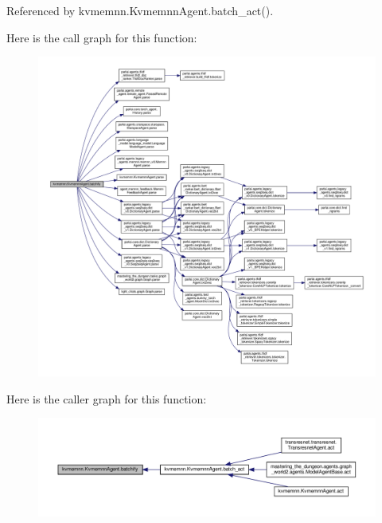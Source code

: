 Referenced by kvmemnn.\+Kvmemnn\+Agent.\+batch\+\_\+act().

Here is the call graph for this function\+:
\nopagebreak
\begin{figure}[H]
\begin{center}
\leavevmode
\includegraphics[width=350pt]{classkvmemnn_1_1KvmemnnAgent_ac7dba84c37dab7ef33f52d263fbdbdc7_cgraph}
\end{center}
\end{figure}
Here is the caller graph for this function\+:
\nopagebreak
\begin{figure}[H]
\begin{center}
\leavevmode
\includegraphics[width=350pt]{classkvmemnn_1_1KvmemnnAgent_ac7dba84c37dab7ef33f52d263fbdbdc7_icgraph}
\end{center}
\end{figure}
\mbox{\label{classkvmemnn_1_1KvmemnnAgent_aa7f07d5123c47f74f48ae395a66c9d73}} 
